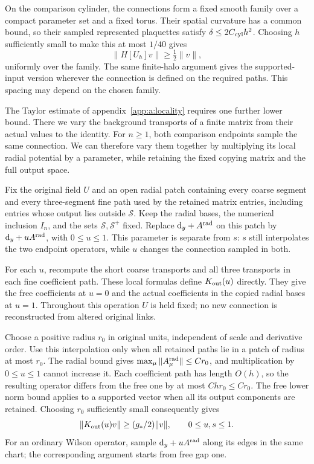 \documentclass[11pt,a4paper]{article}
\theoremstyle{remark}
\newcommand{\dd}{\mathrm d}
\begin{document}
On the comparison cylinder, the connections form a fixed smooth family
over a compact parameter set and a fixed torus. Their spatial curvature
has a common bound, so their sampled represented plaquettes satisfy
$\delta\le2C_{\rm cyl}h^2$. Choosing $h$ sufficiently small to make
this at most $1/40$ gives
\begin{equation}
 \|H[U_h]v\|\ge\tfrac12\|v\|,
 \label{app:s:ordinary-gap}
\end{equation}
uniformly over the family. The same finite-halo argument gives the
supported-input version wherever the connection is defined on the
required paths. This spacing may depend on the chosen family.

The Taylor estimate of appendix~\ref{app:a:locality} requires one
further lower bound. There we vary the background transports of a
finite matrix from their actual values to the identity. For $n\ge1$,
both comparison endpoints sample the same connection. We can therefore
vary them together by multiplying its local radial potential by a
parameter, while retaining the fixed copying matrix and the full
output space.

Fix the original field $U$ and an open radial patch containing every
coarse segment and every three-segment fine path used by the retained
matrix entries, including entries whose output lies outside
$\mathcal S$. Keep the radial
bases, the numerical inclusion $I_n$, and the sets
$\mathcal S,\mathcal S^+$ fixed. Replace $\dd_y+A^{\rm rad}$
on this patch by $\dd_y+uA^{\rm rad}$, with $0\le u\le1$.
This parameter is separate from $s$: $s$ still interpolates the two
endpoint operators, while $u$ changes the connection sampled in both.

For each $u$, recompute the short coarse transports and all three
transports in each fine coefficient path. These local formulas define
$K_{\rm out}(u)$ directly. They give the free coefficients at $u=0$
and the actual coefficients in the copied radial bases at $u=1$.
Throughout this operation $U$ is held fixed; no new connection is
reconstructed from altered original links.

Choose a positive radius $r_0$ in original units, independent of scale
and derivative order. Use this interpolation only when all retained
paths lie in a patch of radius at most $r_0$. The radial bound gives
$\max_\mu\|A^{\rm rad}_\mu\|\le Cr_0$, and multiplication by
$0\le u\le1$ cannot increase it. Each coefficient path has length
$O(h)$, so the resulting operator differs from the free one by at
most $Chr_0\le Cr_0$. The free lower norm bound applies to a
supported vector when all its output components are retained.
Choosing $r_0$ sufficiently small consequently gives
\begin{equation}
 \|K_{\rm out}(u)v\|\ge(g_*/2)\|v\|,
 \qquad 0\le u,s\le1.
 \label{app:s:weak-gap}
\end{equation}
For an ordinary Wilson operator, sample $\dd_y+uA^{\rm rad}$ along
its edges in the same chart; the corresponding argument starts from
free gap one.
\end{document}
